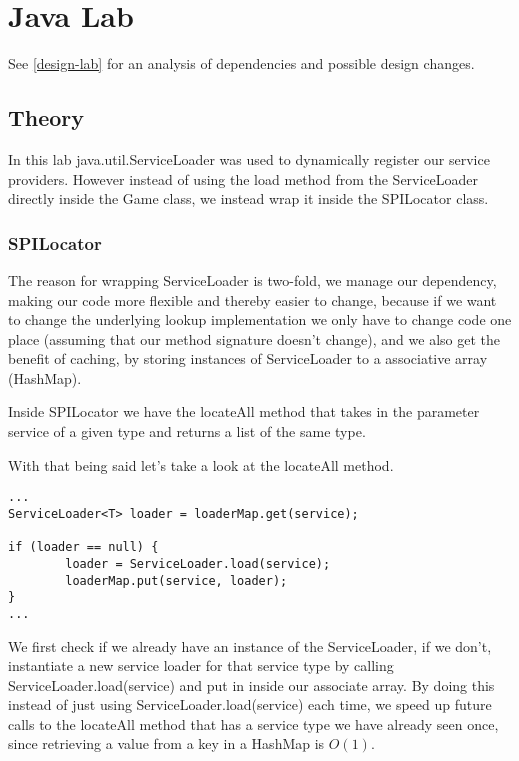 % 
\section{Java Lab}

See \ref{design-lab} for an analysis of dependencies and possible design
changes.

\subsection{Theory}
In this lab java.util.ServiceLoader was used to dynamically register our
service providers. However instead of using the load method from the
ServiceLoader directly inside the Game class, we instead wrap it inside the SPILocator class.

\subsubsection{SPILocator}
The reason for wrapping ServiceLoader is two-fold, we manage our dependency, making our code more
flexible and thereby easier to change, because if we want to change the
underlying lookup implementation we only have to change code one place (assuming
that our method signature doesn't change), and we also get the benefit of caching,
by storing instances of ServiceLoader to a associative array (HashMap).

Inside SPILocator we have the locateAll method that takes in the parameter service of
a given type and returns a list of the same type.

With that being said let's take a look at the locateAll method.

\begin{verbatim}
...
ServiceLoader<T> loader = loaderMap.get(service);

if (loader == null) {
        loader = ServiceLoader.load(service);
        loaderMap.put(service, loader);
}
...
\end{verbatim}

We first check if we already have an instance of the ServiceLoader, if
we don't, instantiate a new service loader for that service type by calling
ServiceLoader.load(service) and put in inside our associate array.
By doing this instead of just using ServiceLoader.load(service) each time, we
speed up future calls to the locateAll method that has a service type we have
already seen once, since retrieving a value from a key in a HashMap is $O(1)$.

